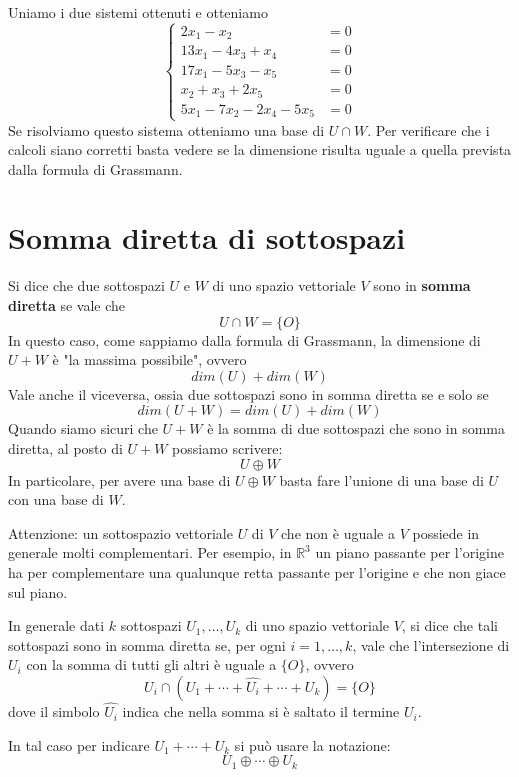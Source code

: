 Uniamo i due sistemi ottenuti e otteniamo
\begin{equation*}
	\begin{cases}
		2x_1 - x_2                & = 0 \\
		13x_1 - 4x_3 + x_4        & = 0 \\
		17x_1 - 5x_3 - x_5        & = 0 \\
		x_2 + x_3 + 2x_5          & = 0 \\
		5x_1 - 7x_2 - 2x_4 - 5x_5 & = 0
	\end{cases}
\end{equation*}
Se risolviamo questo sistema otteniamo una base di $U \cap W$. Per verificare che i calcoli
siano corretti basta vedere se la dimensione risulta uguale a quella prevista dalla formula
di Grassmann.

\section{Somma diretta di sottospazi}
Si dice che due sottospazi $U$ e $W$ di uno spazio vettoriale $V$ sono in
\textbf{somma diretta} se vale che \[ U \cap W = \{O\} \] In questo caso,
come sappiamo dalla formula di Grassmann, la dimensione di $U + W$ \`e "la
massima possibile", ovvero \[ dim(U) + dim(W) \] Vale anche il
viceversa, ossia due sottospazi sono in somma diretta se e solo se
\[ dim(U + W) = dim(U) + dim(W) \] Quando siamo sicuri che $U + W$ \`e la somma di due
sottospazi che sono in somma diretta, al posto di $U + W$ possiamo scrivere:
\begin{equation*}
	U \oplus W
\end{equation*}
In particolare, per avere una base di $U \oplus W$ basta fare l'unione di una
base di $U$ con una base di $W$.

\begin{observation}
	Attenzione: un sottospazio vettoriale $U$ di $V$ che non \`e uguale a $V$
	possiede in generale molti complementari. Per esempio, in $\mathbb{R}^3$
	un piano passante per l'origine ha per complementare una qualunque retta
	passante per l'origine e che non giace sul piano.
\end{observation}

In generale dati $k$ sottospazi $U_1, \dots, U_k$ di uno spazio vettoriale $V$,
si dice che tali sottospazi sono in somma diretta se, per ogni
$i = 1, \dots, k$, vale che l'intersezione di $U_i$ con la somma di tutti
gli altri \`e uguale a $\{O\}$, ovvero
\begin{equation*}
	U_i \cap (U_1 + \cdots + \hat{U_i} + \cdots + U_k) = \{O\}
\end{equation*}
dove il simbolo $\hat{U_i}$ indica che nella somma si \`e saltato il termine
$U_i$.

In tal caso per indicare $U_1 + \cdots + U_k$ si pu\`o usare la notazione:
\begin{equation*}
	U_1 \oplus \cdots \oplus U_k
\end{equation*}